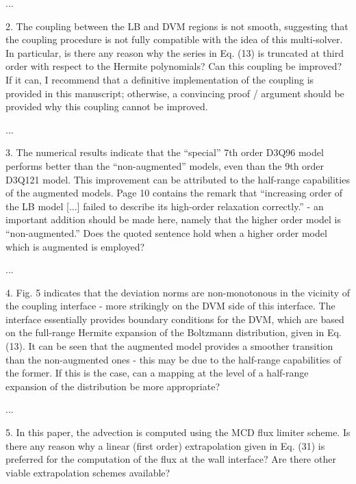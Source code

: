 \documentclass{article}
\begin{document}
...

\begin{quoting}
    2. The coupling between the LB and DVM regions is not
    smooth, suggesting that the coupling procedure is not
    fully compatible with the idea of this multi-solver.
    In particular, is there any reason why the series in
    Eq. (13) is truncated at third order with respect to
    the Hermite polynomials? Can this coupling be improved?
    If it can, I recommend that a definitive implementation
    of the coupling is provided in this manuscript; otherwise,
    a convincing proof / argument should be provided why this
    coupling cannot be improved.
\end{quoting}

...

\begin{quoting}
    3. The numerical results indicate that the ``special''
    7th order D3Q96 model performs better than the
    ``non-augmented'' models, even than the 9th order
    D3Q121 model. This improvement can be attributed to
    the half-range capabilities of the augmented models.
    Page 10 contains the remark that ``increasing order of
    the LB model [...] failed to describe its high-order
    relaxation correctly.'' - an important addition should
    be made here, namely that the higher order model is
    ``non-augmented.'' Does the quoted sentence hold when
    a higher order model which is augmented is employed?
\end{quoting}

...

\begin{quoting}
    4. Fig. 5 indicates that the deviation norms are
    non-monotonous in the vicinity of the coupling
    interface - more strikingly on the DVM side of this
    interface. The interface essentially provides boundary
    conditions for the DVM, which are based on the
    full-range Hermite expansion of the Boltzmann
    distribution, given in Eq. (13). It can be seen that
    the augmented model provides a smoother transition than
    the non-augmented ones - this may be due to the
    half-range capabilities of the former. If this is
    the case, can a mapping at the level of a half-range
    expansion of the distribution be more appropriate?
\end{quoting}

...

\begin{quoting}
    5. In this paper, the advection is computed using
    the MCD flux limiter scheme. Is there any reason why
    a linear (first order) extrapolation given in
    Eq. (31) is preferred for the computation of the
    flux at the wall interface? Are there other viable
    extrapolation schemes available?
\end{quoting}
\end{document}
